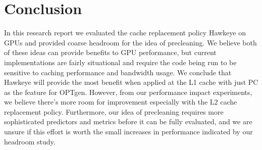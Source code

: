 \chapter{Conclusion}

In this research report we evaluated the cache replacement policy Hawkeye on GPUs and provided coarse headroom for the idea of precleaning. We believe both of these ideas can provide benefits to GPU performance, but current implementations are fairly situational and require the code being run to be sensitive to caching performance and bandwidth usage. We conclude that Hawkeye will provide the most benefit when applied at the L1 cache with just PC as the feature for OPTgen. However, from our performance impact experiments, we believe there's more room for improvement especially with the L2 cache replacement policy. Furthermore, our idea of precleaning requires more sophisticated predictors and metrics before it can be fully evaluated, and we are unsure if this effort is worth the small increases in performance indicated by our headroom study.
